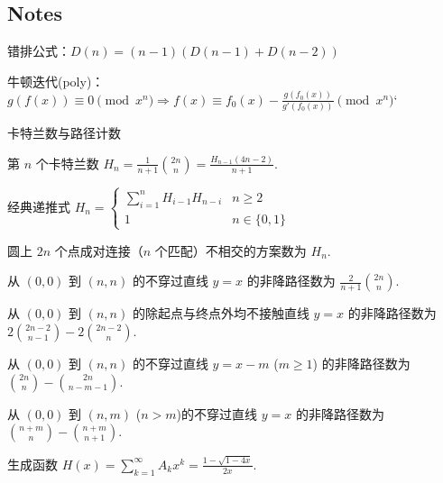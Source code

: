 \subsection{Notes}

\begin{compactenum}[I.]
\item 错排公式：$D(n) = (n-1)\left( D(n-1)+D(n-2) \right)$
\item 牛顿迭代(poly)：
\(
g\left(f(x)\right) \equiv 0 \pmod{x^n} 
\Rightarrow 
f(x) \equiv f_0(x) - \frac{g\left(f_0(x)\right)}{g'\left(f_0(x)\right)}
\pmod{x^n}‘
\)
\item 卡特兰数与路径计数
  \begin{compactenum}[1.]
    \item 第 $n$ 个卡特兰数 $H_n = \frac{1}{n + 1}\binom{2n}{n} = \frac{H_{n - 1}(4n - 2)}{n + 1}$.
    \item 经典递推式 $H_n = \begin{cases}
        \sum\limits_{i = 1}^{n} H_{i - 1} H_{n - i} & n \geqslant 2 \\
        1 & n \in \{0, 1\}
    \end{cases}$
    \item 圆上 $2n$ 个点成对连接（$n$ 个匹配）不相交的方案数为 $H_n$.
    \item 从 $(0, 0)$ 到 $(n, n)$ 的不穿过直线 $y = x$ 的非降路径数为 $\frac{2}{n + 1}\binom{2n}{n}$.
    \item 从 $(0, 0)$ 到 $(n, n)$ 的除起点与终点外均不接触直线 $y = x$ 的非降路径数为 $2\binom{2n - 2}{n - 1} - 2\binom{2n - 2}{n}$.
    \item 从 $(0, 0)$ 到 $(n, n)$ 的不穿过直线 $y = x - m$ ($m \geqslant 1$) 的非降路径数为 $\binom{2n}{n} - \binom{2n}{n - m - 1}$.
    \item 从 $(0, 0)$ 到 $(n, m)$ ($n > m$)的不穿过直线 $y = x$ 的非降路径数为 $\binom{n + m}{n} - \binom{n + m}{n + 1}$.
    \item 生成函数 $H(x) = \sum\limits_{k = 1}^{\infty} A_k x^k = \frac{1 - \sqrt{1 - 4x}}{2x}$.
  \end{compactenum}
\end{compactenum}

